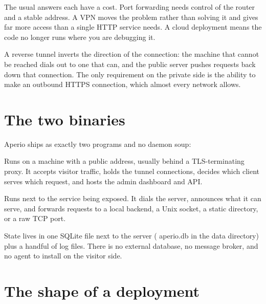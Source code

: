 \documentclass[11pt,a4paper,oneside]{book}
\newcommand{\aperiobreakableunderscore}{\textunderscore\allowbreak}
\newcommand{\aperiocodebreaks}{\XeTeXinterchartokenstate=1 }
\newcommand{\aperiocodebreaks}{}
\DeclareRobustCommand{\code}[1]{{\ttfamily\small\aperiocodebreaks
  \let\_\aperiobreakableunderscore#1}}
\begin{document}
The usual answers each have a cost. Port forwarding needs control of the
router and a stable address. A VPN moves the problem rather than solving
it and gives far more access than a single HTTP service needs. A cloud
deployment means the code no longer runs where you are debugging it.

A reverse tunnel inverts the direction of the connection: the machine that
cannot be reached dials out to one that can, and the public server pushes
requests back down that connection. The only requirement on the private
side is the ability to make an outbound HTTPS connection, which almost
every network allows.

\section{The two binaries}

Aperio ships as exactly two programs and no daemon soup:

\begin{description}[leftmargin=1.6em,style=nextline]
  \item[\code{aperio-server}] Runs on a machine with a public address,
        usually behind a TLS-terminating proxy. It accepts visitor
        traffic, holds the tunnel connections, decides which client
        serves which request, and hosts the admin dashboard and API.
  \item[\code{aperio-client}] Runs next to the service being exposed. It
        dials the server, announces what it can serve, and forwards
        requests to a local backend, a Unix socket, a static directory,
        or a raw TCP port.
\end{description}

State lives in one SQLite file next to the server (\code{aperio.db} in the
data directory) plus a handful of log files. There is no external
database, no message broker, and no agent to install on the visitor side.

\section{The shape of a deployment}
\end{document}
